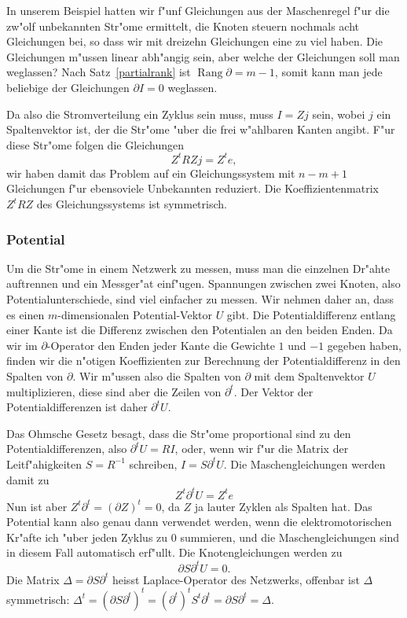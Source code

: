 In unserem Beispiel hatten wir f"unf Gleichungen aus der Maschenregel
f"ur die zw"olf unbekannten Str"ome ermittelt, die Knoten steuern
nochmals acht Gleichungen bei, so dass wir mit dreizehn Gleichungen
eine zu viel haben. Die Gleichungen m"ussen linear abh"angig sein,
aber welche der Gleichungen soll man weglassen?
Nach Satz~\ref{partialrank} ist $\operatorname{Rang}\partial=m-1$,
somit kann man jede beliebige der Gleichungen $\partial I=0$ weglassen.

Da also die Stromverteilung ein Zyklus sein muss, muss $I=Zj$ sein, wobei
$j$ ein Spaltenvektor ist, der die Str"ome "uber die frei w"ahlbaren
Kanten angibt. F"ur diese Str"ome folgen die Gleichungen
\[
Z^tRZj=Z^te,
\]
wir haben damit das Problem auf ein Gleichungssystem mit $n-m+1$
Gleichungen f"ur ebensoviele Unbekannten reduziert.
Die Koeffizientenmatrix $Z^tRZ$ des Gleichungssystems ist symmetrisch.

\subsubsection{Potential}
Um die Str"ome in einem Netzwerk zu messen, muss man die einzelnen
Dr"ahte auftrennen und ein Messger"at einf"ugen.
Spannungen zwischen zwei Knoten, also Potentialunterschiede,
sind viel einfacher zu messen.
Wir nehmen daher an, dass es einen $m$-dimensionalen
Potential-Vektor $U$ gibt.
Die Potentialdifferenz entlang einer Kante ist die Differenz
zwischen den Potentialen an den beiden Enden.
Da wir im $\partial$-Operator den Enden jeder Kante die Gewichte
$1$ und $-1$ gegeben haben, finden wir die n"otigen Koeffizienten
zur Berechnung der Potentialdifferenz in den Spalten von $\partial$.
Wir m"ussen also die Spalten von $\partial$ mit dem Spaltenvektor $U$
multiplizieren, diese sind aber die Zeilen von $\partial^t$.
Der Vektor der Potentialdifferenzen ist daher $\partial^t U$.

Das Ohmsche Gesetz besagt, dass die Str"ome proportional sind zu
den Potentialdifferenzen, also $\partial^t U=RI$, oder, wenn
wir f"ur die Matrix der Leitf"ahigkeiten $S=R^{-1}$ schreiben,
$I=S\partial^t U$. Die Maschengleichungen werden damit zu
\[
Z^t\partial^t U=Z^te
\]
Nun ist aber $Z^t\partial^t=(\partial Z)^t=0$, da $Z$ ja lauter
Zyklen als Spalten hat. Das Potential kann also genau dann verwendet
werden, wenn die elektromotorischen Kr"afte ich "uber jeden Zyklus zu $0$
summieren, und die
Maschengleichungen sind in diesem Fall automatisch erf"ullt.
Die Knotengleichungen werden zu
\[
\partial S\partial^tU=0.
\]
Die Matrix $\Delta = \partial S\partial ^t$ heisst Laplace-Operator des
Netzwerks, offenbar ist $\Delta$ symmetrisch:
$\Delta^t=(\partial S\partial^t)^t
         =(\partial^t)^tS^t\partial^t
         =\partial S\partial^t
         =\Delta$.

